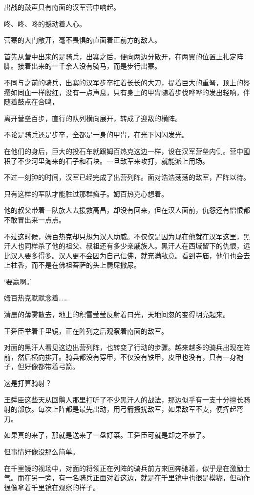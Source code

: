出战的鼓声只有南面的汉军营中响起。

咚、咚、咚的撼动着人心。

营寨的大门敞开，毫不畏惧的直面着正前方的敌人。

首先从营中出来的是骑兵，出寨之后，便向两边分散开，在两翼的位置上扎定阵脚。接着出来的一千余人没有骑马，而是步行出寨。

不同与之前的骑兵，出寨的汉军步卒扛着长长的大刀，提着巨大的重弩，顶上的盔缨如同血一样殷红，没有一点声息，只有身上的甲胄随着步伐哗哗的发出轻响，伴随着鼓点在合鸣，

离开营垒百步，直行的队列横向展开，转成了迎敌的横阵。

不论是骑兵还是步卒，全都是一身的甲胄，在光下闪闪发光。

在他们的身后，巨大的投石车就跟姆百热克这边一样，设在汉军营垒内侧。营中囤积了不少河里淘来的石子和石块。一旦敌军来攻打，就能派上用场。

不过一刻钟的时间，汉军已经完成了出营列阵。面对浩浩荡荡的敌军，严阵以待。

只有这样的军队才能胜过那群疯子。姆百热克心想着。

他的叔父带着一队族人去援救高昌，却没有回来，但在汉人面前，仇怨还有憎恨都不敢冒出来一点点。

不过这时候，姆百热克却只想为汉人助威。不仅仅是因为现在他就在汉军这里，黑汗人也同样杀了他的祖父、叔祖还有多少亲戚族人。黑汗人在西域留下的仇恨，远比汉人要多得多。汉人更不会因为自己信佛，就充满敌意。看到寺庙，他们也会去上柱香，而不是在佛祖菩萨的头上屙屎撒尿。

‘要赢啊。’

姆百热克默默念着……

清晨的薄雾散去，地上的积雪莹莹反射着曰光，天地间忽的变得明亮起来。

王舜臣举着千里镜，正在阵列之后观察着南面的敌军。

对面的黑汗人看见这边出营列阵，也转变了行动的步骤。越来越多的骑兵出现在阵前，然后横向排开。骑兵都没有穿甲，不仅没有铁甲，皮甲也没有，只有一身袍子，但好像都带着弓箭。

这是打算骑射？

王舜臣这些天从回鹘人那里打听了不少黑汗人的战法，那边似乎有一支十分擅长骑射的部族。每次上阵都是最先出动，用弓箭搔扰敌军，如果敌军不支，便挥起弯刀。

如果真的来了，那就是送来了一盘好菜。王舜臣可就是却之不恭了。

但事情好像没那么简单。

在千里镜的视场中，对面的将领正在列阵的骑兵前方来回奔驰着，似乎是在激励士气。而在另一旁，有一名骑兵正面对着这边，就是在千里镜中也很是模糊，但动作很像拿着千里镜在观察的样子。

